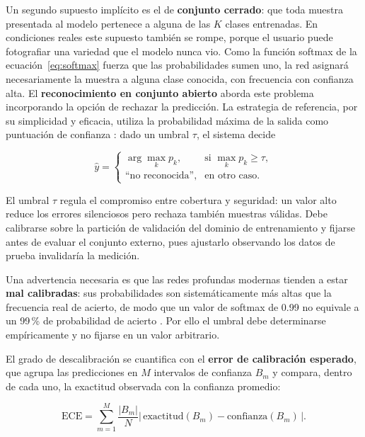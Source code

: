 Un segundo supuesto implícito es el de \textbf{conjunto cerrado}: que toda
muestra presentada al modelo pertenece a alguna de las $K$ clases
entrenadas. En condiciones reales este supuesto también se rompe, porque el
usuario puede fotografiar una variedad que el modelo nunca vio. Como la
función softmax de la ecuación~\ref{eq:softmax} fuerza que las
probabilidades sumen uno, la red asignará necesariamente la muestra a alguna
clase conocida, con frecuencia con confianza alta. El \textbf{reconocimiento
en conjunto abierto} aborda este problema incorporando la opción de
rechazar la predicción. La estrategia de referencia, por su simplicidad y
eficacia, utiliza la probabilidad máxima de la salida como puntuación de
confianza \citep{hendrycks2017}: dado un umbral $\tau$, el sistema decide

\begin{equation}
\hat{y} =
\begin{cases}
\arg\max_{k} p_{k}, & \text{si } \max_{k} p_{k} \geq \tau, \\[4pt]
\text{``no reconocida''}, & \text{en otro caso.}
\end{cases}
\label{eq:rechazo}
\end{equation}

El umbral $\tau$ regula el compromiso entre cobertura y seguridad: un valor
alto reduce los errores silenciosos pero rechaza también muestras válidas.
Debe calibrarse sobre la partición de validación del dominio de
entrenamiento y fijarse antes de evaluar el conjunto externo, pues ajustarlo
observando los datos de prueba invalidaría la medición.

Una advertencia necesaria es que las redes profundas modernas tienden a
estar \textbf{mal calibradas}: sus probabilidades son sistemáticamente más
altas que la frecuencia real de acierto, de modo que un valor de softmax de
0.99 no equivale a un 99\,\% de probabilidad de acierto \citep{guo2017}. Por
ello el umbral debe determinarse empíricamente y no fijarse en un valor
arbitrario.

El grado de descalibración se cuantifica con el \textbf{error de
calibración esperado}, que agrupa las predicciones en $M$ intervalos de
confianza $B_{m}$ y compara, dentro de cada uno, la exactitud observada con
la confianza promedio:

\begin{equation}
\mathrm{ECE} = \sum_{m=1}^{M} \frac{|B_{m}|}{N}
               \bigl|\, \mathrm{exactitud}(B_{m}) - \mathrm{confianza}(B_{m}) \,\bigr|.
\label{eq:ece}
\end{equation}

